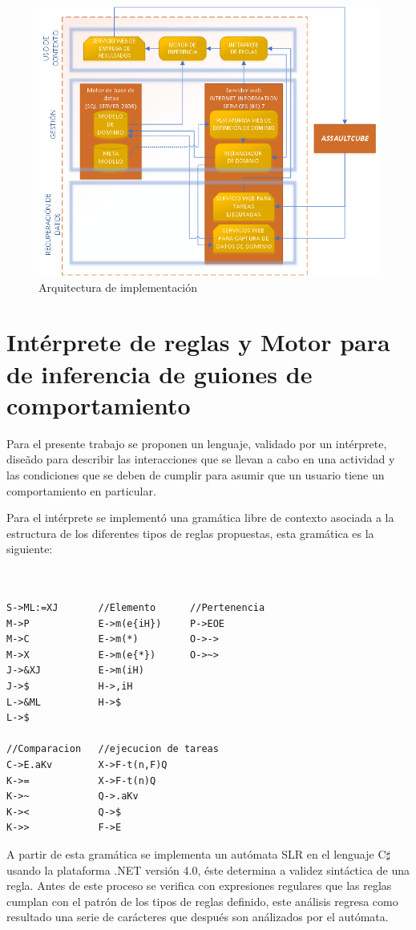\begin{figure}[h]
\centering
\includegraphics[width=0.7\linewidth]{images/arquitecturaImplementacion}
\caption{Arquitectura de implementaci\'on}
\label{imp:Implementacion}
\end{figure}

\section{Int\'erprete de reglas y Motor para de inferencia de guiones de comportamiento}

Para el presente trabajo se proponen un lenguaje, validado por un int\'erprete, dise\~ado para describir las interacciones que se llevan a cabo en una actividad y las condiciones que se deben de cumplir para asumir que un usuario tiene un comportamiento en particular.

Para el int\'erprete se implement\'o una gram\'atica libre de contexto asociada a la estructura de los diferentes tipos de reglas propuestas, esta gram\'atica es la siguiente:

\begin{verbatim}


S->ML:=XJ       //Elemento      //Pertenencia
M->P            E->m(e{iH})     P->EOE
M->C            E->m(*)         O->->
M->X            E->m(e{*})      O->~>
J->&XJ          E->m(iH)            
J->$            H->,iH              
L->&ML          H->$                
L->$            

//Comparacion   //ejecucion de tareas
C->E.aKv        X->F-t(n,F)Q
K->=            X->F-t(n)Q
K->~            Q->.aKv
K-><            Q->$
K->>            F->E
\end{verbatim}

A partir de esta gram\'atica se implementa un aut\'omata SLR en el lenguaje C$\sharp$ usando la plataforma .NET versi\'on 4.0,  \'este determina a validez sint\'actica de una regla. Antes de este proceso se verifica con expresiones regulares que las reglas cumplan con el patr\'on de los tipos de reglas definido, este an\'alisis regresa como resultado una serie de car\'acteres que despu\'es son an\'alizados por el aut\'omata.

